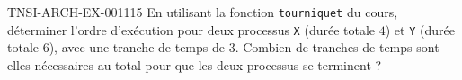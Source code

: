 \begin{exercice}{TNSI-ARCH-EX-001}{1}{15}
En utilisant la fonction \lstinline{tourniquet} du cours, déterminer l'ordre d'exécution pour deux processus \texttt{X} (durée totale $4$) et \texttt{Y} (durée totale $6$), avec une tranche de temps de $3$. Combien de tranches de temps sont-elles nécessaires au total pour que les deux processus se terminent ?
\end{exercice}
